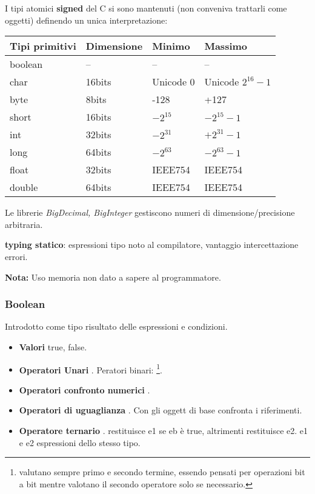 I tipi atomici \textbf{signed} del C si sono mantenuti (non conveniva trattarli come oggetti) definendo un unica interpretazione:
\begin{center}
	\begin{tabular}{llll}
		\hline
		Tipi  primitivi & Dimensione & Minimo & Massimo \\
		\hline
		boolean & -- & -- & -- \\
		char & 16bits & Unicode 0 & Unicode $2^{16}-1$ \\
		byte & 8bits & -128 & +127 \\
		short & 16bits & $-2^{15}$ & $-2^{15}-1$ \\
		int & 32bits & $-2^{31}$& $+2^{31}-1$ \\
		long & 64bits  & $-2^{63}$& $-2^{63}-1$\\
		float & 32bits & IEEE754 & IEEE754 \\
		double & 64bits & IEEE754 & IEEE754 \\
		\hline
	\end{tabular}

	{\tiny Le librerie \textit{BigDecimal, BigInteger} gestiscono numeri di dimensione/precisione arbitraria.}
\end{center}

\textbf{typing statico}: espressioni tipo noto al compilatore, vantaggio intercettazione errori.

\textbf{Nota:} Uso memoria non dato a sapere al programmatore.

\subsubsection{Boolean}
Introdotto come tipo risultato delle espressioni e condizioni.
\begin{itemize}
	\item \textbf{Valori} true, false.
	\item \textbf{Operatori Unari} . Peratori binari: \footnote{ valutano sempre primo e secondo termine, essendo pensati per operazioni bit a bit mentre  valotano il secondo operatore solo se necessario.}.
	\item \textbf{Operatori confronto numerici} \inline{<, >, <=, >=}.
	\item \textbf{Operatori di uguaglianza} \inline{==, !=}. Con gli oggett di base confronta i riferimenti.
	\item \textbf{Operatore ternario} . restituisce e1 se eb è true, altrimenti restituisce e2. e1 e e2 espressioni dello stesso tipo.
\end{itemize}

